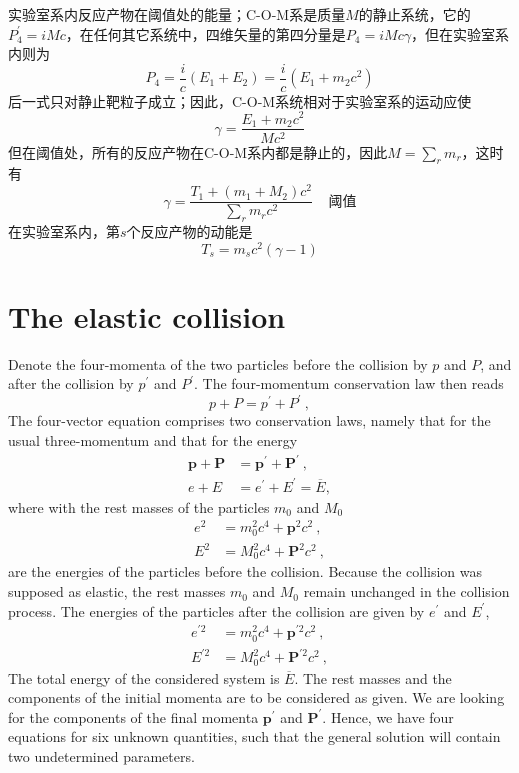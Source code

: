 \documentclass[11pt,a4paper]{article}
\renewcommand{\vec}[1]{\boldsymbol{#1}}
\begin{document}
实验室系内反应产物在阈值处的能量；C-O-M系是质量$M$的静止系统，它的$P^{\prime}_4 = i M c$，在任何其它系统中，四维矢量的第四分量是$P_4 = i M c \gamma$，但在实验室系内则为
\begin{equation}
P_4 = \frac{i}{c} (E_1 +E_2) = \frac{i}{c} (E_1 +m_2 c^2)
\end{equation}
后一式只对静止靶粒子成立；因此，C-O-M系统相对于实验室系的运动应使
\begin{equation}
\gamma = \frac{E_1 +m_2 c^2}{Mc^2}
\end{equation}
但在阈值处，所有的反应产物在C-O-M系内都是静止的，因此$M = \sum\limits_r m_r$，这时有
\begin{equation}
\gamma = \frac{T_1 +(m_1 +M_2) c^2}{\sum\limits_r m_r c^2}   ~~~~~\text{阈值}
\end{equation}
在实验室系内，第$s$个反应产物的动能是
\begin{equation}
T_s = m_s c^2 (\gamma -1)
\end{equation}

\section{The elastic collision}
\cite{greiner2003classical} Denote the four-momenta of the two particles before the collision by $p$ and $P$, and after the collision by $p^\prime$ and $P^\prime$. The four-momentum conservation law then reads
\begin{equation}
p +P = p^\prime +P^\prime ~,
\end{equation}
The four-vector equation comprises two conservation laws, namely that for the usual three-momentum and that for the energy
\begin{align}
\vec{p} +\vec{P} &= \vec{p}^\prime +\vec{P}^\prime ~, \label{eq:momentum_coserva} \\
e + E &= e^\prime+E^\prime = \overline{E}, \label{eq:energy_coserva}
\end{align}
where with the rest masses of the particles $m_0$ and $M_0$
\begin{align}
e^2 &= m_0^2 c^4 +\vec{p}^2 c^2 ~, \\
E^2 &= M_0^2 c^4 +\vec{P}^2 c^2 ~,
\end{align}
are the energies of the particles before the collision. Because the collision was supposed as elastic, the rest masses $m_0$ and $M_0$ remain unchanged in the collision process. The energies of the particles after the collision are given by $e^\prime$ and $E^\prime$,
\begin{align}
e^{\prime 2} &= m_0^2 c^4 +\vec{p}^{\prime 2} c^2 ~, \\
E^{\prime 2} &= M_0^2 c^4 +\vec{P}^{\prime 2} c^2 ~,
\end{align}
The total energy of the considered system is $\overline{E}$. The rest masses and the components of the initial momenta are to be considered as given. We are looking for the components of the final momenta $\vec{p}^{\prime}$ and $\vec{P}^{\prime}$. Hence, we have four equations for six unknown quantities, such that the general solution will contain two undetermined parameters. 
\end{document}
